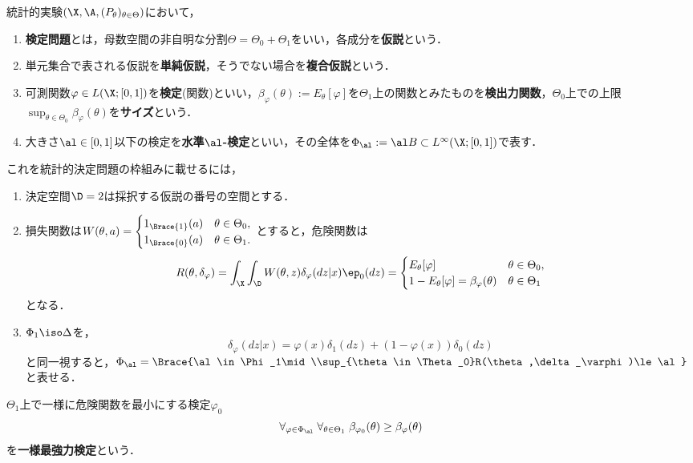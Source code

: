 \documentclass[uplatex,dvipdfmx]{jsreport}
\begin{document}
\begin{model}
    統計的実験$(\X,\A,(P_\theta)_{\theta\in\Theta})$において，
    \begin{enumerate}
        \item \textbf{検定問題}とは，母数空間の非自明な分割$\Theta=\Theta_0+\Theta_1$をいい，各成分を\textbf{仮説}という．
        \item 単元集合で表される仮説を\textbf{単純仮説}，そうでない場合を\textbf{複合仮説}という．
        \item 可測関数$\varphi\in L(\X;[0,1])$を\textbf{検定}(関数)といい，$\beta_\varphi(\theta):=E_\theta[\varphi]$を$\Theta_1$上の関数とみたものを\textbf{検出力関数}，$\Theta_0$上での上限
        $\sup_{\theta\in\Theta_0}\beta_\varphi(\theta)$を\textbf{サイズ}という．
        \item 大きさ$\al\in[0,1]$以下の検定を\textbf{水準$\al$-検定}といい，その全体を$\Phi_\al:=\al B\subset L^\infty(\X;[0,1])$で表す．
    \end{enumerate}
    これを統計的決定問題の枠組みに載せるには，
    \begin{enumerate}
        \item 決定空間$\D=2$は採択する仮説の番号の空間とする．
        \item 損失関数は$W(\theta,a)=\begin{cases}
            1_{\Brace{1}}(a)&\theta\in\Theta_0,\\
            1_{\Brace{0}}(a)&\theta\in\Theta_1.
        \end{cases}$
        とすると，危険関数は
        \[R(\theta,\delta_\varphi)=\int_\X\int_\D W(\theta,z)\delta_\varphi(dz|x)\ep_0(dz)=\begin{cases}
            E_\theta[\varphi]&\theta\in\Theta_0,\\
            1-E_\theta[\varphi]=\beta_\varphi(\theta)&\theta\in\Theta_1
        \end{cases}\]
        となる．
        \item $\Phi_1\iso\Delta$を，
        \[\delta_\varphi(dz|x)=\varphi(x)\delta_1(dz)+(1-\varphi(x))\delta_0(dz)\]
        と同一視すると，$\Phi_\al=\Brace{\al\in\Phi_1\mid\\sup_{\theta\in\Theta_0}R(\theta,\delta_\varphi)\le\al}$と表せる．
    \end{enumerate}
\end{model}

\begin{definition}
    $\Theta_1$上で一様に危険関数を最小にする検定$\varphi_0$
    \[\forall_{\varphi\in\Phi_\al}\;\forall_{\theta\in\Theta_1}\;\beta_{\varphi_0}(\theta)\ge\beta_\varphi(\theta)\]
    を\textbf{一様最強力検定}という．
\end{definition}
\end{document}
